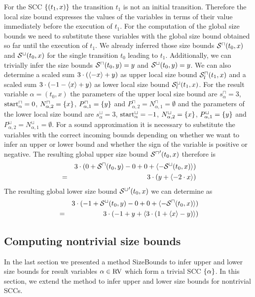 For the SCC $\lbrace (t_1,x) \rbrace$ the transition $t_1$ is not an initial transition.
Therefore the local size bound expresses the values of the variables in terms of their value immediately before the execution of $t_1$.
For the computation of the global size bounds we need to substitute these variables with the global size bound obtained so far until the execution of $t_1$.
We already inferred those size bounds ${\mathcal{S}^\sqcap}(t_0,x)$ and ${\mathcal{S}^\sqcup}(t_0,x)$ for the single transition $t_0$ leading to $t_1$.
Additionally, we can trivially infer the size bounds ${\mathcal{S}^\sqcap}(t_0,y) = y$ and ${\mathcal{S}^\sqcup}(t_0,y) = y$.
We can also determine a scaled sum $3 \cdot (\langle-x\rangle + y)$ as upper local size bound ${\mathcal{S}^\sqcap_l}(t_1,x)$ and a scaled sum $3 \cdot (-1 - \langle x\rangle + y)$ as lower local size bound ${\mathcal{S}^\sqcup_l}(t_1,x)$.
For the result variable $\alpha = (t_0,x)$ the parameters of the upper local size bound are $s^\sqcap_\alpha = 3$, $\text{start}^\sqcap_\alpha = 0$, $N^\sqcap_{\alpha,2} = \lbrace x \rbrace$, $P^\sqcap_{\alpha,1} = \lbrace y \rbrace$ and $P^\sqcap_{\alpha,2} = N^\sqcap_{\alpha,1} = \emptyset$ and the parameters of the lower local size bound are $s^\sqcup_\alpha = 3$, $\text{start}^\sqcup_\alpha = -1$, $N^\sqcup_{\alpha,2} = \lbrace x \rbrace$, $P^\sqcup_{\alpha,1} = \lbrace y \rbrace$ and $P^\sqcup_{\alpha,2} = N^\sqcup_{\alpha,1} = \emptyset$.
For a sound approximation it is necessary to substitute the variables with the correct incoming bounds depending on whether we want to infer an upper or lower bound and whether the sign of the variable is positive or negative.
The resulting global upper size bound ${\mathcal{S}^\sqcap}'(t_0,x)$ therefore is 
\begin{align*}
  && 3 \cdot ( 0 + {\mathcal{S}^\sqcap}(t_0, y) - 0 + 0 + \langle-{\mathcal{S}^\sqcup}(t_0, x)\rangle ) \\
  & = & 3 \cdot ( y + \langle-2 \cdot x\rangle )
\end{align*}
The resulting global lower size bound ${\mathcal{S}^\sqcup}'(t_0,x)$ we can determine as
\begin{align*}
  && 3 \cdot ( -1 + {\mathcal{S}^\sqcup}(t_0, y) - 0 + 0 + \langle-{\mathcal{S}^\sqcap}(t_0, x)\rangle ) \\
  & = & 3 \cdot ( -1 + y + \langle3 \cdot (1 + \langle x\rangle - y)\rangle )
\end{align*}


\subsection{Computing nontrivial size bounds}

In the last section we presented a method SizeBounds to infer upper and lower size bounds for result variables $\alpha \in \text{RV}$ which form a trivial SCC $\lbrace \alpha \rbrace$.
In this section, we extend the method to infer upper and lower size bounds for nontrivial SCCs.

